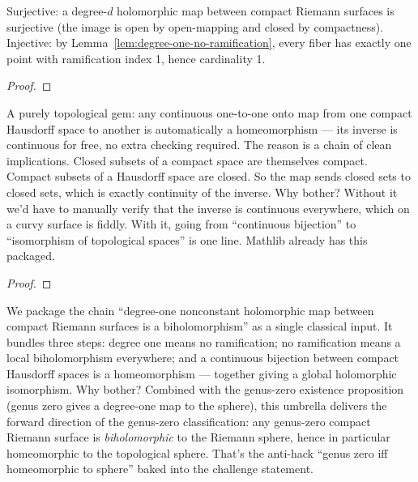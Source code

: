 \begin{proofsketch}
Surjective: a degree-\(d\) holomorphic map between compact Riemann
surfaces is surjective (the image is open by open-mapping and closed by
compactness). Injective: by
Lemma~\ref{lem:degree-one-no-ramification}, every fiber has exactly one
point with ramification index 1, hence cardinality 1.
\end{proofsketch}


\begin{proof}\leanok\end{proof}

\begin{layman}
A purely topological gem: any continuous one-to-one onto map from one
compact Hausdorff space to another is automatically a homeomorphism ---
its inverse is continuous for free, no extra checking required. The
reason is a chain of clean implications. Closed subsets of a compact
space are themselves compact. Compact subsets of a Hausdorff space are
closed. So the map sends closed sets to closed sets, which is exactly
continuity of the inverse. Why bother? Without it we'd have to manually
verify that the inverse is continuous everywhere, which on a curvy
surface is fiddly. With it, going from ``continuous bijection'' to
``isomorphism of topological spaces'' is one line. Mathlib already has
this packaged.
\end{layman}


\begin{proof}\leanok\end{proof}

\begin{layman}
We package the chain ``degree-one nonconstant holomorphic map between
compact Riemann surfaces is a biholomorphism'' as a single classical
input. It bundles three steps: degree one means no ramification; no
ramification means a local biholomorphism everywhere; and a continuous
bijection between compact Hausdorff spaces is a homeomorphism --- together
giving a global holomorphic isomorphism. Why bother? Combined with the
genus-zero existence proposition (genus zero gives a degree-one map to
the sphere), this umbrella delivers the forward direction of the
genus-zero classification: any genus-zero compact Riemann surface is
\emph{biholomorphic} to the Riemann sphere, hence in particular
homeomorphic to the topological sphere. That's the anti-hack
``genus zero iff homeomorphic to sphere'' baked into the challenge
statement.
\end{layman}

